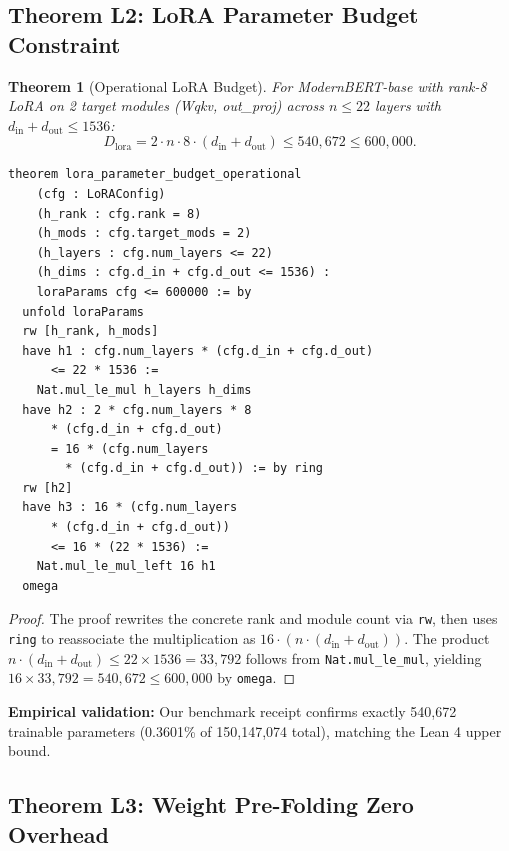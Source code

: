 \documentclass[10pt,journal,compsoc]{IEEEtran}
\newtheorem{theorem}{Theorem}
\theoremstyle{remark}
\begin{document}
\subsection{Theorem L2: LoRA Parameter Budget Constraint}

\begin{theorem}[Operational LoRA Budget]
For ModernBERT-base with rank-8 LoRA on 2 target modules (Wqkv, out\_proj) across $n \leq 22$ layers with $d_{\text{in}} + d_{\text{out}} \leq 1536$:
\begin{equation}
D_{\text{lora}} = 2 \cdot n \cdot 8 \cdot (d_{\text{in}} + d_{\text{out}}) \leq 540{,}672 \leq 600{,}000.
\end{equation}
\end{theorem}

\begin{lstlisting}[caption={Theorem L2 in Lean 4 --- Fully Proved}]
theorem lora_parameter_budget_operational
    (cfg : LoRAConfig)
    (h_rank : cfg.rank = 8)
    (h_mods : cfg.target_mods = 2)
    (h_layers : cfg.num_layers <= 22)
    (h_dims : cfg.d_in + cfg.d_out <= 1536) :
    loraParams cfg <= 600000 := by
  unfold loraParams
  rw [h_rank, h_mods]
  have h1 : cfg.num_layers * (cfg.d_in + cfg.d_out)
      <= 22 * 1536 :=
    Nat.mul_le_mul h_layers h_dims
  have h2 : 2 * cfg.num_layers * 8
      * (cfg.d_in + cfg.d_out)
      = 16 * (cfg.num_layers
        * (cfg.d_in + cfg.d_out)) := by ring
  rw [h2]
  have h3 : 16 * (cfg.num_layers
      * (cfg.d_in + cfg.d_out))
      <= 16 * (22 * 1536) :=
    Nat.mul_le_mul_left 16 h1
  omega
\end{lstlisting}

\begin{proof}
The proof rewrites the concrete rank and module count via \texttt{rw}, then uses \texttt{ring} to reassociate the multiplication as $16 \cdot (n \cdot (d_{\text{in}} + d_{\text{out}}))$. The product $n \cdot (d_{\text{in}} + d_{\text{out}}) \leq 22 \times 1536 = 33{,}792$ follows from \texttt{Nat.mul\_le\_mul}, yielding $16 \times 33{,}792 = 540{,}672 \leq 600{,}000$ by \texttt{omega}.
\end{proof}

\textbf{Empirical validation:} Our benchmark receipt confirms exactly 540,672 trainable parameters (0.3601\% of 150,147,074 total), matching the Lean 4 upper bound.

\subsection{Theorem L3: Weight Pre-Folding Zero Overhead}
\end{document}
